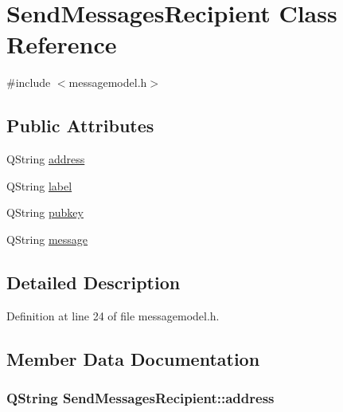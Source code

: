\hypertarget{class_send_messages_recipient}{}\section{Send\+Messages\+Recipient Class Reference}
\label{class_send_messages_recipient}


{\ttfamily \#include $<$messagemodel.\+h$>$}

\subsection*{Public Attributes}
\begin{DoxyCompactItemize}
\item 
Q\+String \hyperlink{class_send_messages_recipient_ad9279e229231121bc24996f2b707a01f}{address}
\item 
Q\+String \hyperlink{class_send_messages_recipient_aebcf95e556030552cd0f5ad5b4901540}{label}
\item 
Q\+String \hyperlink{class_send_messages_recipient_ae6bb5d8b86ab31f8357f71653286d7ca}{pubkey}
\item 
Q\+String \hyperlink{class_send_messages_recipient_ab6bc9e82b0340b70d8f18897300cf578}{message}
\end{DoxyCompactItemize}


\subsection{Detailed Description}


Definition at line 24 of file messagemodel.\+h.



\subsection{Member Data Documentation}
\hypertarget{class_send_messages_recipient_ad9279e229231121bc24996f2b707a01f}{}
\subsubsection[{address}]{\setlength{\rightskip}{0pt plus 5cm}Q\+String Send\+Messages\+Recipient\+::address}\label{class_send_messages_recipient_ad9279e229231121bc24996f2b707a01f}


